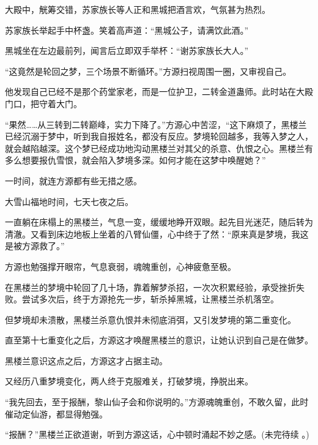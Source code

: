 \begin{this_body}
大殿中，觥筹交错，苏家族长等人正和黑城把酒言欢，气氛甚为热烈。

苏家族长举起手中杯盏。笑着高声道：“黑城公子，请满饮此酒。”

黑城坐在左边最前列，闻言后立即双手举杯：“谢苏家族长大人。”

“这竟然是轮回之梦，三个场景不断循环。”方源扫视周围一圈，又审视自己。

他发现自己已经不是那个药堂家老，而是一位护卫，二转金道蛊师。此时站在大殿门口，把守着大门。

“果然……从三转到二转巅峰，实力下降了。”方源心中苦涩，“这下麻烦了，黑楼兰已经沉溺于梦中，听到我自报姓名，都没有反应。梦境轮回越多，我等入梦之人，就会越陷越深。这个梦已经成功地沟动黑楼兰对其父的杀意、仇恨之心。黑楼兰有多么想要报仇雪恨，就会陷入梦境多深。如何才能在这梦中唤醒她？”

一时间，就连方源都有些无措之感。

大雪山福地时间，七天七夜之后。

一直躺在床榻上的黑楼兰，气息一变，缓缓地睁开双眼。起先目光迷茫，随后转为清澈。又看到床边地板上坐着的八臂仙僵，心中终于了然：“原来真是梦境，我这是被方源救了。”

方源也勉强撑开眼帘，气息衰弱，魂魄重创，心神疲惫至极。

在黑楼兰的梦境中轮回了几十场，靠着解梦杀招，一次次积累经验，承受挫折失败。尝试多次后，终于方源抢先一步，斩杀掉黑城，让黑楼兰杀机落空。

但梦境却未溃散，黑楼兰杀意仇恨并未彻底消弭，又引发梦境的第二重变化。

直至第十七重变化之后，方源这才唤醒黑楼兰的意识，让她认识到自己是在做梦。

黑楼兰意识这点之后，方源这才占据主动。

又经历八重梦境变化，两人终于克服难关，打破梦境，挣脱出来。

“我先回去，至于报酬，黎山仙子会和你说明的。”方源魂魄重创，不敢久留，此时催动定仙游，都显得勉强。

“报酬？”黑楼兰正欲道谢，听到方源这话，心中顿时涌起不妙之感。(未完待续 。)

\end{this_body}

